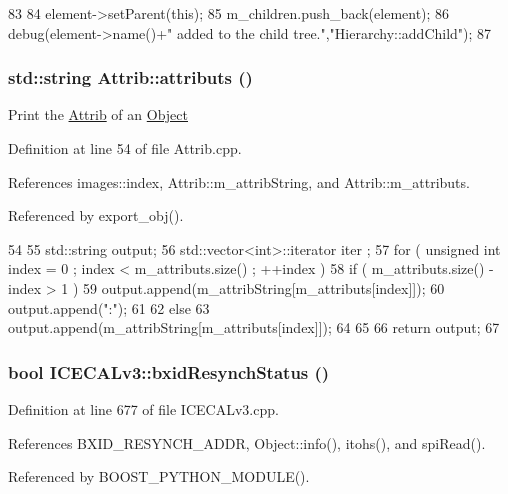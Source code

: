 \begin{DoxyCode}
83                                           {
84   element->setParent(this);
85   m_children.push_back(element);
86   debug(element->name()+" added to the child tree.","Hierarchy::addChild");
87 }
\end{DoxyCode}
\hypertarget{classAttrib_aee7bbf16b144887f196e1341b24f8a26}{
\subsubsection[{attributs}]{\setlength{\rightskip}{0pt plus 5cm}std::string Attrib::attributs ()}}
\label{classAttrib_aee7bbf16b144887f196e1341b24f8a26}
Print the \hyperlink{classAttrib}{Attrib} of an \hyperlink{classObject}{Object} 

Definition at line 54 of file Attrib.cpp.

References images::index, Attrib::m\_\-attribString, and Attrib::m\_\-attributs.

Referenced by export\_\-obj().


\begin{DoxyCode}
54                             {
55   std::string output;
56   std::vector<int>::iterator iter ;
57   for ( unsigned int index = 0 ; index < m_attributs.size() ; ++index ) {
58     if ( m_attributs.size() - index > 1 ) {
59       output.append(m_attribString[m_attributs[index]]);
60       output.append(":");
61     }
62     else {
63       output.append(m_attribString[m_attributs[index]]);
64     }
65   }
66   return output;
67 }
\end{DoxyCode}
\hypertarget{classICECALv3_a545f51b915a6de5c5f450622d0651a85}{
\subsubsection[{bxidResynchStatus}]{\setlength{\rightskip}{0pt plus 5cm}bool ICECALv3::bxidResynchStatus ()}}
\label{classICECALv3_a545f51b915a6de5c5f450622d0651a85}


Definition at line 677 of file ICECALv3.cpp.

References BXID\_\-RESYNCH\_\-ADDR, Object::info(), itohs(), and spiRead().

Referenced by BOOST\_\-PYTHON\_\-MODULE().


